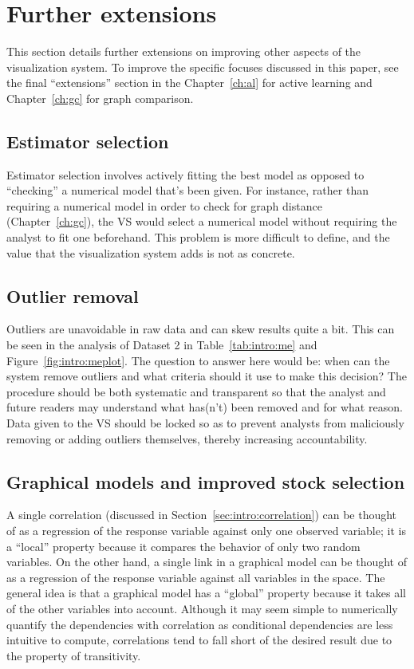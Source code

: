 \section{Further extensions}
\label{sec:futurework}

This section details further extensions on improving other aspects of the 
visualization system. To improve the specific focuses discussed in this paper, 
see the final ``extensions'' section in the Chapter~\ref{ch:al} for active 
learning and Chapter~\ref{ch:gc} for graph comparison.

\subsection{Estimator selection}
\label{sec:futurework:estimatorselection}

Estimator selection involves actively fitting the best model as opposed to
``checking'' a numerical model that’s been given. For instance, rather than 
requiring a numerical model in order to check for graph distance 
(Chapter~\ref{ch:gc}), the VS would select a numerical model without requiring 
the analyst to fit one beforehand. This problem is more difficult
to define, and the value that the visualization system adds is not as concrete.

\subsection{Outlier removal}
\label{sec:futurework:outlier}

Outliers are unavoidable in raw data and can skew results quite a bit. This can 
be seen in the analysis of Dataset 2 in Table~\ref{tab:intro:me} and 
Figure~\ref{fig:intro:meplot}. The question to answer here would be: when can 
the system remove outliers and what criteria should it use to make this 
decision? The procedure should be both systematic and transparent so that the 
analyst and future readers may understand what has(n't) been removed and for 
what reason. Data given to the VS should be locked so as to prevent analysts 
from maliciously removing or adding outliers themselves, thereby increasing 
accountability. 

\subsection{Graphical models and improved stock selection}
\label{sec:futurework:graphicalmodel}

A single correlation (discussed in Section~\ref{sec:intro:correlation}) can be 
thought of as a regression of the response variable
against only one observed variable; it is a ``local'' property because it
compares the behavior of only two random variables. On the other hand, a single
link in a graphical model can be thought of as a regression of the response
variable against all variables in the space. The general idea is that a 
graphical model has a ``global'' property because it takes all
of the other variables into account. Although it may seem simple to numerically
quantify the dependencies with correlation as conditional dependencies are less
intuitive to compute, correlations tend to fall short of the desired result due
to the property of transitivity.

